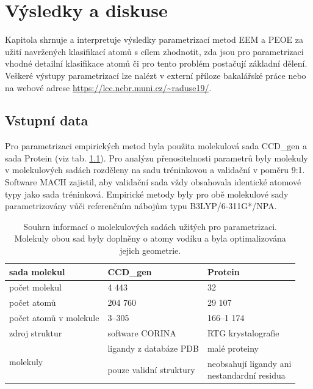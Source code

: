 \chapter{Výsledky a diskuse}
Kapitola shrnuje a interpretuje výsledky parametrizací metod EEM a PEOE za užití navržených klasifikací atomů s cílem zhodnotit, zda jsou pro parametrizaci vhodné detailní klasifikace atomů či pro tento problém postačují základní dělení. Veškeré výstupy parametrizací lze nalézt v externí příloze bakalářské práce nebo na webové adrese \url{https://lcc.ncbr.muni.cz/~raduse19/}.  

\section{Vstupní data}
Pro parametrizaci empirických metod byla použita molekulová sada CCD\_gen a sada Protein (viz tab. \ref{moleculesets}). Pro analýzu přenositelnosti parametrů byly molekuly v molekulových sadách rozděleny na sadu tréninkovou a validační v poměru 9:1. Software MACH zajistil, aby validační sada vždy obsahovala identické atomové typy jako sada tréninková. Empirické metody byly pro obě molekulové sady parametrizovány vůči referenčním nábojům typu B3LYP/6-311G*/NPA.
\begin{table}[h]
    \renewcommand{\arraystretch}{1.35}
    \centering
    \begin{tabular}{l|l|l}
         sada molekul &  \textbf{CCD\_gen} \cite{krab1k}
         & \textbf{Protein}\\
         \hline
         počet molekul & 4 443 & 32\\
         počet atomů & 204 760 & 29 107\\
         počet atomů v molekule & 3–305 & 166–1 174 \\
         zdroj struktur & software CORINA & RTG krystalografie \\
         \hline
         \multirow{2}{8em}{molekuly} & 
            ligandy z databáze PDB & malé proteiny\\
         & pouze validní struktury & \makecell[l]{neobsahují ligandy ani \\nestandardní residua}
    \end{tabular}
    \caption{Souhrn informací o molekulových sadách užitých pro parametrizaci. Molekuly obou sad 
    byly doplněny o atomy vodíku a byla optimalizována jejich geometrie.}
    \label{moleculesets}
\end{table}

